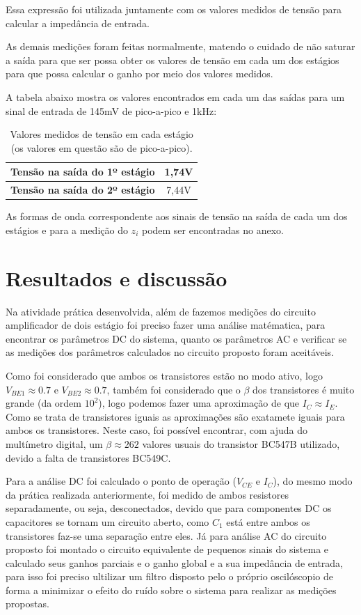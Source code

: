 Essa expressão foi utilizada juntamente com os valores medidos de tensão para calcular a impedância de entrada.

As demais medições foram feitas normalmente, matendo o cuidado de não saturar a saída para que ser possa obter os valores de tensão em cada um dos estágios para que possa calcular o ganho por meio dos valores medidos.

A tabela abaixo mostra os valores encontrados  em cada um das saídas para um sinal de entrada de 145mV de pico-a-pico e 1kHz:

\begin{table}[H]
\centering
\begin{tabular}{l|c|}
\hline
\multicolumn{1}{|l|}{\textbf{Tensão na saída do 1º estágio}} & 1,74V \\ \hline
\multicolumn{1}{|l|}{\textbf{Tensão na saída do 2º estágio}} & 7,44V \\ \hline
\end{tabular}
\caption{Valores medidos de tensão em cada estágio (os valores em questão são de pico-a-pico).}
\end{table}

As formas de onda correspondente aos sinais de tensão na saída de cada um dos estágios e para a medição do $z_i$ podem ser encontradas no anexo.

\section{Resultados e discussão}

Na atividade prática desenvolvida, além de fazemos medições do circuito amplificador de dois estágio foi preciso fazer uma análise matématica, para encontrar os parâmetros DC do sistema, quanto os parâmetros AC e verificar se as medições dos parâmetros calculados no circuito proposto foram aceitáveis.

Como foi considerado que ambos os transistores estão no modo ativo, logo $V_{BE1} \approx 0.7$ e $V_{BE2} \approx 0.7$, também foi considerado que o $\beta$ dos transistores é muito grande (da ordem $10^2$), logo podemos fazer uma aproximação de que $I_C \approx I_E$. Como se trata de transistores iguais as aproximações são exatamete iguais para ambos os transistores. Neste caso, foi possível encontrar, com ajuda do multímetro digital, um $\beta \approx 262 $ valores usuais do transistor BC547B utilizado, devido a falta de transistores BC549C. 

Para a análise DC foi calculado o ponto de operação ($V_{CE}$ e $I_{C}$), do mesmo modo da prática realizada anteriormente, foi medido de ambos resistores separadamente, ou seja, desconectados, devido que para componentes DC os capacitores se tornam um circuito aberto, como $C_1$ está entre ambos os transistores faz-se uma separação entre eles. Já para análise AC do circuito proposto foi montado o circuito equivalente de pequenos sinais do sistema e calculado seus ganhos parciais e o ganho global e a sua impedância de entrada, para isso foi preciso ultilizar um filtro disposto pelo o próprio oscilóscopio de forma a minimizar o efeito do ruído sobre o sistema para realizar as medições propostas.

